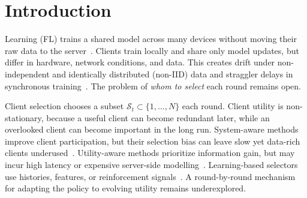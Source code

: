 \documentclass[journal]{IEEEtran}
\theoremstyle{remark}
\newcommand{\revision}[1]{#1}
\begin{document}
\section{Introduction}

 Learning (FL) trains a shared model across many devices without moving their raw data to the server~\cite{mcmahan2017communication}. \revision{Clients train locally and share only model updates, but differ in hardware, network conditions, and data. This creates drift under non-independent and identically distributed (non-IID) data and straggler delays in synchronous training}~\cite{karimireddy2020scaffold,mai2024study,tapwal2026stragglers,forootani2026asynchronous,borazjani2026redefining}. The problem of \textit{whom to select} each round remains open.

Client selection chooses a subset $\revision{\mathcal{S}_t} \subset \{1, \ldots, N\}$ each round. \revision{Client utility is non-stationary, because a useful client can become redundant later, while an overlooked client can become important in the long run.} System-aware methods improve client participation, but their selection bias can leave slow yet data-rich clients underused~\cite{nishio2019client,chai2020tifl}. Utility-aware methods prioritize information gain, but may incur high latency or expensive server-side modelling~\cite{lai2021oort,tang2022fedcor,xu2024federated,yan2023criticalfl,ning2024fedgcs}. Learning-based selectors use histories, features, or reinforcement signals~\cite{wang2020optimizing,pan2024contextual,kazemi2026robust}. \revision{A round-by-round mechanism for adapting the policy to evolving utility remains underexplored.}
\end{document}
